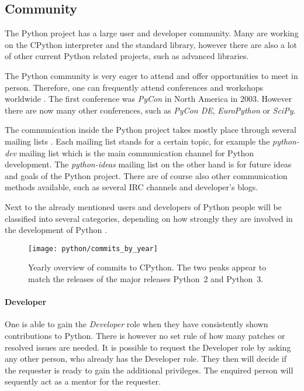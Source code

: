 
\subsection{Community} %

The Python project has a large user and developer community. Many are working
on the CPython interpreter and the standard library, however there are also a
lot of other current Python related projects, such as advanced libraries.

The Python community is very eager to attend and offer opportunities to meet in
person. Therefore, one can frequently attend conferences and workshops
worldwide \cite{PythonConferences}. The first conference was \emph{PyCon} in
North America in 2003. However there are now many other conferences, such as
\emph{PyCon DE}, \emph{EuroPython} or \emph{SciPy}.

The communication inside the Python project takes mostly place through several
mailing lists \cite{PythonCommunication}. Each mailing list stands for a
certain topic, for example the \emph{python-dev} mailing list which is the main
communication channel for Python development. The \emph{python-ideas} mailing
list on the other hand is for future ideas and goals of the Python project.
There are of course also other communication methods available, such as several
\ac{IRC} channels and developer's blogs.

Next to the already mentioned users and developers of Python people will be
classified into several categories, depending on how strongly they are involved
in the development of Python \cite{PythonCoreDeveloper}.

\begin{figure}[htbp]
  \centering
  \texttt{[image: python/commits\_by\_year]}
  \caption[Commits by Year, Python]
  {Yearly overview of commits to CPython. The two peaks appear to match the
    releases of the major releases Python~2 and Python~3.}
\end{figure}

\paragraph{Developer}

One is able to gain the \emph{Developer} role when they have consistently shown
contributions to Python. There is however no set rule of how many patches or
resolved issues are needed. It is possible to request the Developer role by
asking any other person, who already has the Developer role. They then will
decide if the requester is ready to gain the additional privileges. The
enquired person will sequently act as a mentor for the requester.

